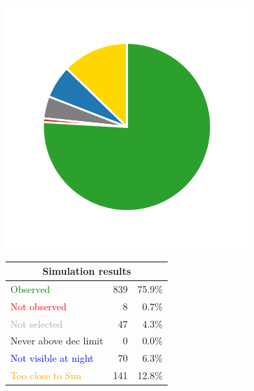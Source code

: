 \begin{colsection}
\begin{colsection}
\begin{figure}[p]
    \begin{center}
        \begin{minipage}[t]{0.15\textwidth}\vspace{0.6cm}
            \includegraphics[trim={.5cm 0 .5cm 0},clip,width=\linewidth]{images/gw_sims/2n8+2s8_pie.png}
        \end{minipage}
        \begin{minipage}[t]{0.45\textwidth}\vspace{0pt}
            \begin{tabular}{lrr}
                \multicolumn{3}{c}{\textbf{Simulation results}} \\
                \midrule
                \textcolor{Green}{Observed} & 839 & 75.9\% \\
                \textcolor{Red}{Not observed} & 8 & 0.7\% \\
                \textcolor{darkgray}{Not selected} & 47 & 4.3\% \\
                \textcolor{NavyBlue}{Never above dec limit} & 0 & 0.0\% \\
                \textcolor{Blue}{Not visible at night} & 70 & 6.3\% \\
                \textcolor{Orange}{Too close to Sun} & 141 & 12.8\% \\

\end{tabular}
\end{minipage}
\end{center}
\end{figure}
\end{colsection}
\end{colsection}
